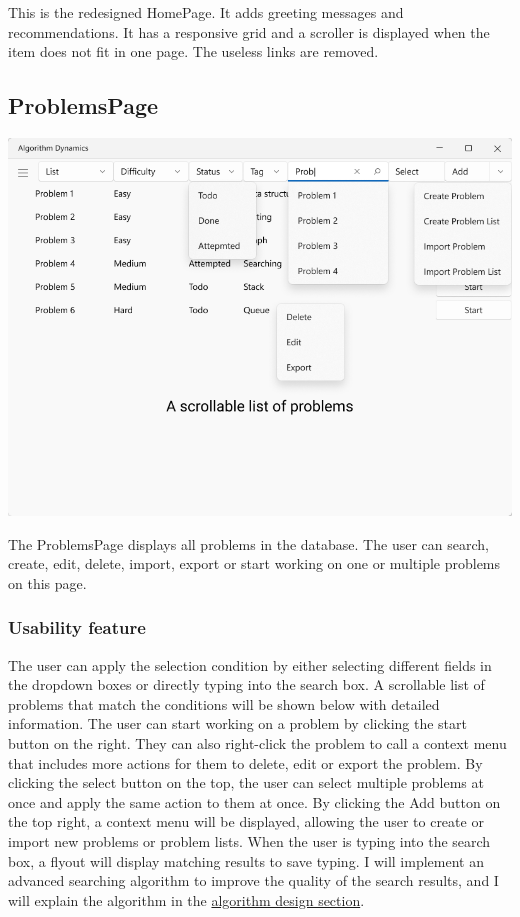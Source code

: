\documentclass[a4paper]{report}
\begin{document}
This is the redesigned HomePage. It adds greeting messages and recommendations. It has a responsive grid and a scroller is displayed when the item does not fit in one page. The useless links are removed.

\subsection{ProblemsPage}
\label{sec:ProblemsPageDesign}


\includegraphics[width=\textwidth, height=\textheight, keepaspectratio]{ProblemsPage-design}

The ProblemsPage displays all problems in the database. The user can search, create, edit, delete, import, export or start working on one or multiple problems on this page.

\subsubsection{Usability feature}

The user can apply the selection condition by either selecting different fields in the dropdown boxes or directly typing into the search box. A scrollable list of problems that match the conditions will be shown below with detailed information. The user can start working on a problem by clicking the start button on the right. They can also right-click the problem to call a context menu that includes more actions for them to delete, edit or export the problem. By clicking the select button on the top, the user can select multiple problems at once and apply the same action to them at once. By clicking the Add button on the top right, a context menu will be displayed, allowing the user to create or import new problems or problem lists. When the user is typing into the search box, a flyout will display matching results to save typing. I will implement an advanced searching algorithm to improve the quality of the search results, and I will explain the algorithm in the \hyperref[sec:algorithm design]{algorithm design section}.
\end{document}
